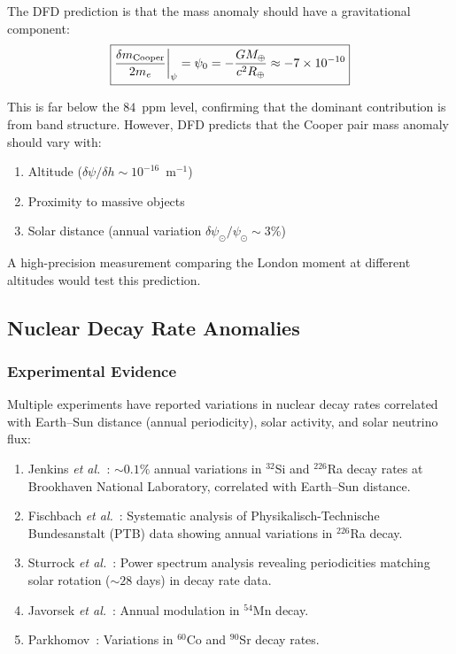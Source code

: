\documentclass[aps,prb,twocolumn,superscriptaddress,floatfix,nofootinbib,longbibliography]{revtex4-2}
\begin{document}
The DFD prediction is that the mass anomaly should have a gravitational
component:
\begin{equation}
\boxed{
\frac{\delta m_{\rm Cooper}}{2m_e}\bigg|_\psi = \psi_0
= -\frac{GM_\oplus}{c^2 R_\oplus} \approx -7 \times 10^{-10}
}
\label{eq:cooper-mass-pred}
\end{equation}

This is far below the $84$~ppm level, confirming that the dominant
contribution is from band structure.  However, DFD predicts that the
Cooper pair mass anomaly should vary with:
\begin{enumerate}[nosep]
\item Altitude ($\delta\psi/\delta h \sim 10^{-16}$~m$^{-1}$)
\item Proximity to massive objects
\item Solar distance (annual variation $\delta\psi_\odot/\psi_\odot \sim 3\%$)
\end{enumerate}

A high-precision measurement comparing the London moment at different
altitudes would test this prediction.

\subsection{Nuclear Decay Rate Anomalies}

\subsubsection{Experimental Evidence}

Multiple experiments have reported variations in nuclear decay rates
correlated with Earth--Sun distance (annual periodicity), solar
activity, and solar neutrino flux:

\begin{enumerate}[nosep]
\item Jenkins \textit{et al.}~\cite{Jenkins2009}: $\sim 0.1\%$ annual
  variations in $^{32}$Si and $^{226}$Ra decay rates at Brookhaven
  National Laboratory, correlated with Earth--Sun distance.
\item Fischbach \textit{et al.}~\cite{Fischbach2009}: Systematic analysis
  of Physikalisch-Technische Bundesanstalt (PTB) data showing annual
  variations in $^{226}$Ra decay.
\item Sturrock \textit{et al.}~\cite{Sturrock2012}: Power spectrum
  analysis revealing periodicities matching solar rotation ($\sim 28$
  days) in decay rate data.
\item Javorsek \textit{et al.}~\cite{Javorsek2010}: Annual modulation in
  $^{54}$Mn decay.
\item Parkhomov~\cite{Parkhomov2010}: Variations in $^{60}$Co and
  $^{90}$Sr decay rates.
\end{enumerate}
\end{document}
